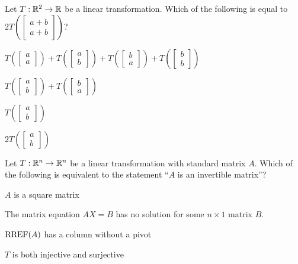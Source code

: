 \documentclass{article}
\begin{document}
\begin{readinessAssuranceTest}
\item Let $T: \mathbb{R}^2 \rightarrow \mathbb{R}$ be a linear transformation.  Which of the following is equal to $2T\left(\begin{bmatrix} a+b \\ a+b \end{bmatrix}\right)$?
\begin{multicols}{2}
\begin{readinessAssuranceTestChoices}
\item $T\left(\begin{bmatrix} a \\ a \end{bmatrix}\right)+T\left(\begin{bmatrix}a \\ b \end{bmatrix} \right)+T\left(\begin{bmatrix}b \\ a \end{bmatrix}\right)+T\left(\begin{bmatrix}b \\ b \end{bmatrix} \right)$ %
\item $T\left(\begin{bmatrix}a \\ b \end{bmatrix} \right)+T\left(\begin{bmatrix}b \\ a \end{bmatrix} \right)$
\item $T\left(\begin{bmatrix}a \\ b \end{bmatrix} \right)$
\item $2T\left(\begin{bmatrix}a \\ b \end{bmatrix} \right)$
\end{readinessAssuranceTestChoices}
\end{multicols}

\item Let $T: \mathbb{R}^n \rightarrow \mathbb{R}^n$ be a linear transformation with standard matrix $A$.  Which of the following is equivalent to the statement ``$A$ is an invertible matrix''?
\begin{readinessAssuranceTestChoices}
\item $A$ is a square matrix
\item The matrix equation $AX=B$ has no solution for some $n\times 1$
      matrix $B$.
\item $\operatorname{RREF}(A)$ has a column without a pivot
\item $T$ is both injective and surjective %
\end{readinessAssuranceTestChoices}


\end{readinessAssuranceTest}
\end{document}
